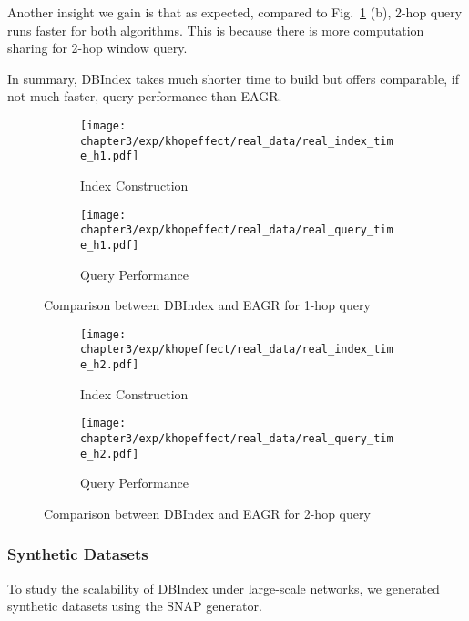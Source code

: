 Another insight we gain is that as expected, compared to Fig.~\ref{fig:1-hop-real} (b), 
2-hop query runs faster for both algorithms. This is because there is more computation sharing for 2-hop window query. 

In summary, 
DBIndex takes much shorter time to build but offers comparable, if not much faster, query 
performance than EAGR.


\begin{figure}[h]
\centering
\begin{subfigure}{0.48\linewidth}
  \centering
  \texttt{[image: chapter3/exp/khopeffect/real\_data/real\_index\_time\_h1.pdf]}
  \caption{Index Construction}
\end{subfigure} \begin{subfigure}{0.48\linewidth}
  \centering
  \texttt{[image: chapter3/exp/khopeffect/real\_data/real\_query\_time\_h1.pdf]}
  \caption{Query Performance}
\end{subfigure}%
\caption{Comparison between DBIndex and EAGR  for 1-hop query}
\label{fig:1-hop-real}
\end{figure}

\begin{figure}[h]
\centering
\begin{subfigure}{0.48\linewidth}
  \centering
  \texttt{[image: chapter3/exp/khopeffect/real\_data/real\_index\_time\_h2.pdf]}
  \caption{Index Construction}
\end{subfigure}
\begin{subfigure}{0.48\linewidth}
  \centering
  \texttt{[image: chapter3/exp/khopeffect/real\_data/real\_query\_time\_h2.pdf]}
  \caption{Query Performance}
\end{subfigure}
\caption{Comparison between DBIndex and EAGR for 2-hop query}
\label{fig:2-hop-real}
\end{figure}


\subsubsection{Synthetic Datasets}
To study the scalability of DBIndex under large-scale networks, 
we generated synthetic datasets using the SNAP generator. 


